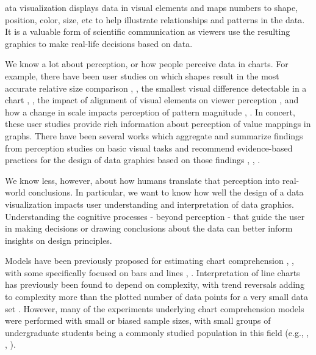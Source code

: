 \documentclass{IEEEcsmag}
\begin{document}
\maketitle

ata visualization displays data in visual elements and maps numbers to shape, position, color, size, etc to help illustrate relationships and patterns in the data. It is a valuable form of scientific communication as viewers use the resulting graphics to make real-life decisions based on data.

We know a lot about perception, or how people perceive data in charts. For example, there have been user studies on which shapes result in the most accurate relative size comparison , , the smallest visual difference detectable in a chart , , the impact of alignment of visual elements on viewer perception , and how a change in scale impacts perception of pattern magnitude , . In concert, these user studies provide rich information about perception of value mappings in graphs. There have been several works which aggregate and summarize findings from perception studies on basic visual tasks and recommend evidence-based practices for the design of data graphics based on those findings , , .

We know less, however, about how humans translate that perception into real-world conclusions. In particular, we want to know how well the design of a data visualization impacts user understanding and interpretation of data graphics. Understanding the cognitive processes - beyond perception - that guide the user in making decisions or drawing conclusions about the data can better inform insights on design principles.

Models have been previously proposed for estimating chart comprehension , , with some specifically focused on bars and lines , . Interpretation of line charts has previously been found to depend on complexity, with trend reversals adding to complexity more than the plotted number of data points for a very small data set . However, many of the experiments underlying chart comprehension models were performed with small or biased sample sizes, with small groups of undergraduate students being a commonly studied population in this field (e.g., , , ).
\end{document}
